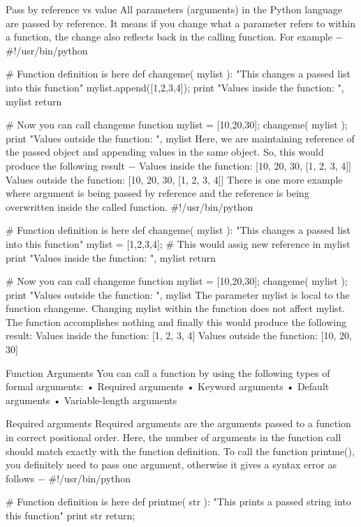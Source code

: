 Pass by reference vs value
All parameters (arguments) in the Python language are passed by reference. It means if you change what a parameter refers to within a function, the change also reflects back in the calling function. For example −
	#!/usr/bin/python

	# Function definition is here
	def changeme( mylist ):
	   "This changes a passed list into this function"
   		mylist.append([1,2,3,4]);
   	print "Values inside the function: ", mylist
   	return
	
	# Now you can call changeme function
	mylist = [10,20,30];
	changeme( mylist );
	print "Values outside the function: ", mylist
Here, we are maintaining reference of the passed object and appending values in the same object. So, this would produce the following result −
	Values inside the function:  [10, 20, 30, [1, 2, 3, 4]]
	Values outside the function:  [10, 20, 30, [1, 2, 3, 4]]
There is one more example where argument is being passed by reference and the reference is being overwritten inside the called function.
	#!/usr/bin/python

	# Function definition is here
	def changeme( mylist ):
	   "This changes a passed list into this function"
	   mylist = [1,2,3,4]; # This would assig new reference in mylist
	   print "Values inside the function: ", mylist
	   return

	# Now you can call changeme function
	mylist = [10,20,30];
	changeme( mylist );
	print "Values outside the function: ", mylist
The parameter mylist is local to the function changeme. Changing mylist within the function does not affect mylist. The function accomplishes nothing and finally this would produce the following result:
	Values inside the function:  [1, 2, 3, 4]
	Values outside the function:  [10, 20, 30]

Function Arguments
You can call a function by using the following types of formal arguments:
•	Required arguments
•	Keyword arguments
•	Default arguments
•	Variable-length arguments

Required arguments
Required arguments are the arguments passed to a function in correct positional order. Here, the number of arguments in the function call should match exactly with the function definition.
To call the function printme(), you definitely need to pass one argument, otherwise it gives a syntax error as follows −
	#!/usr/bin/python

	# Function definition is here
	def printme( str ):
   		"This prints a passed string into this function"
   	print str
   	return;

